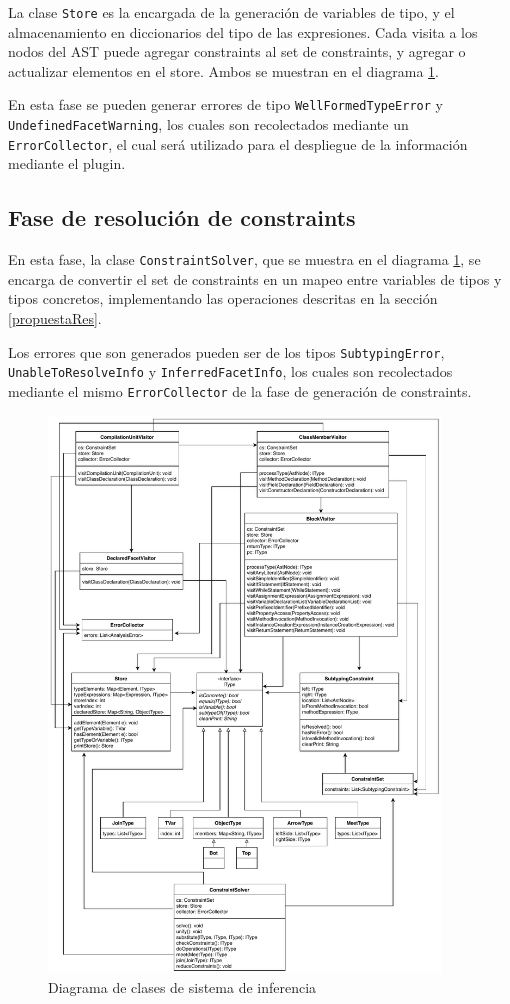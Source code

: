 La clase \texttt{Store} es la encargada de la generación de variables de tipo, y el almacenamiento en diccionarios del tipo de las expresiones. Cada visita a los nodos del AST puede agregar constraints al set de constraints, y agregar o actualizar elementos en el store. Ambos se muestran en el diagrama \ref{uml}.

En esta fase se pueden generar errores de tipo \texttt{WellFormedTypeError} y \texttt{UndefinedFacetWarning}, los cuales son recolectados mediante un \texttt{ErrorCollector}, el cual será utilizado para el despliegue de la información mediante el plugin.

\subsection{Fase de resolución de constraints}
En esta fase, la clase \texttt{ConstraintSolver}, que se muestra en el diagrama \ref{uml}, se encarga de convertir el set de constraints en un mapeo entre variables de tipos y tipos concretos, implementando las operaciones descritas en la sección \ref{propuestaRes}.

Los errores que son generados pueden ser de los tipos \texttt{SubtypingError}, \texttt{UnableToResolveInfo} y \texttt{InferredFacetInfo}, los cuales son recolectados mediante el mismo \texttt{ErrorCollector} de la fase de generación de constraints.

\begin{figure}[ht]
  \centering
  \includegraphics[width=0.93\textwidth]{imagenes/others.pdf}
  \caption{Diagrama de clases de sistema de inferencia}
  \label{uml}
\end{figure}
\clearpage

